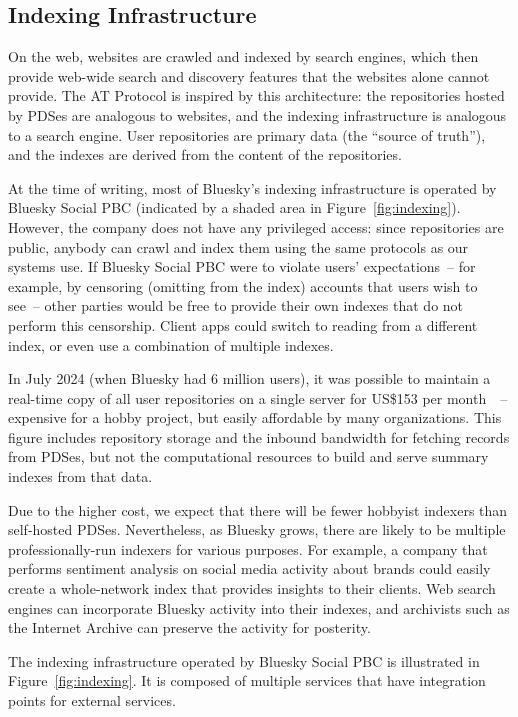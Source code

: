 \documentclass[sigconf]{acmart}
\begin{document}
\subsection{Indexing Infrastructure}\label{sec:indexing}

On the web, websites are crawled and indexed by search engines, which then provide web-wide search and discovery features that the websites alone cannot provide.
The AT Protocol is inspired by this architecture: the repositories hosted by PDSes are analogous to websites, and the indexing infrastructure is analogous to a search engine.
User repositories are primary data (the ``source of truth''), and the indexes are derived from the content of the repositories.

At the time of writing, most of Bluesky's indexing infrastructure is operated by Bluesky Social PBC (indicated by a shaded area in Figure~\ref{fig:indexing}).
However, the company does not have any privileged access: since repositories are public, anybody can crawl and index them using the same protocols as our systems use.
If Bluesky Social PBC were to violate users' expectations~-- for example, by censoring (omitting from the index) accounts that users wish to see~-- other parties would be free to provide their own indexes that do not perform this censorship.
Client apps could switch to reading from a different index, or even use a combination of multiple indexes.

In July 2024 (when Bluesky had 6 million users), it was possible to maintain a real-time copy of all user repositories on a single server for US\$153 per month~\cite{NewboldRelay}~-- expensive for a hobby project, but easily affordable by many organizations.
This figure includes repository storage and the inbound bandwidth for fetching records from PDSes, but not the computational resources to build and serve summary indexes from that data.

Due to the higher cost, we expect that there will be fewer hobbyist indexers than self-hosted PDSes.
Nevertheless, as Bluesky grows, there are likely to be multiple professionally-run indexers for various purposes.
For example, a company that performs sentiment analysis on social media activity about brands could easily create a whole-network index that provides insights to their clients.
Web search engines can incorporate Bluesky activity into their indexes, and archivists such as the Internet Archive can preserve the activity for posterity.

The indexing infrastructure operated by Bluesky Social PBC is illustrated in Figure~\ref{fig:indexing}.
It is composed of multiple services that have integration points for external services.
\end{document}
